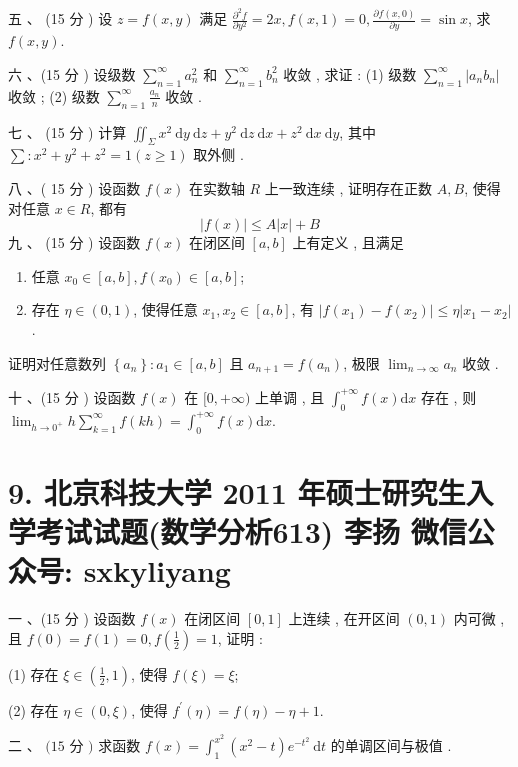 \documentclass[10pt]{article}
\begin{document}
{ 五 、 (15  分 )  设  $z=f(x, y)$  满足  $\frac{\partial^{2} f}{\partial y^{2}}=2 x, f(x, 1)=0, \frac{\partial f(x, 0)}{\partial y}=\sin x$,  求  $f(x, y)$.

 六 、(15  分 )  设级数  $\sum_{n=1}^{\infty} a_{n}^{2}$  和  $\sum_{n=1}^{\infty} b_{n}^{2}$  收敛 ,  求证 : (1)  级数  $\sum_{n=1}^{\infty}\left|a_{n} b_{n}\right|$  收敛 ; (2)  级数  $\sum_{n=1}^{\infty} \frac{a_{n}}{n}$  收敛 .

 七 、 (15  分 )  计算  $\iint_{\Sigma} x^{2} \mathrm{~d} y \mathrm{~d} z+y^{2} \mathrm{~d} z \mathrm{~d} x+z^{2} \mathrm{~d} x \mathrm{~d} y$,  其中  $\sum: x^{2}+y^{2}+z^{2}=1(z \geq 1)$  取外侧 .

 八 、( 15  分 )  设函数  $f(x)$  在实数轴  $R$  上一致连续 ,  证明存在正数  $A, B$,  使得对任意  $x \in R$,  都有 
$$
|f(x)| \leq A|x|+B
$$
 九 、 (15  分 )  设函数  $f(x)$  在闭区间  $[a, b]$  上有定义 ,  且满足 

\begin{enumerate}
  \item  任意  $x_{0} \in[a, b], f\left(x_{0}\right) \in[a, b]$;

  \item  存在  $\eta \in(0,1)$,  使得任意  $x_{1}, x_{2} \in[a, b]$,  有  $\left|f\left(x_{1}\right)-f\left(x_{2}\right)\right| \leq \eta\left|x_{1}-x_{2}\right|$.

\end{enumerate}
 证明对任意数列  $\left\{a_{n}\right\}: a_{1} \in[a, b]$  且  $a_{n+1}=f\left(a_{n}\right)$,  极限  $\lim _{n \rightarrow \infty} a_{n}$  收敛 .

 十 、(15  分 )  设函数  $f(x)$  在  $[0,+\infty)$  上单调 ,  且  $\int_{0}^{+\infty} f(x) \mathrm{d} x$  存在 ,  则  $\lim _{h \rightarrow 0^{+}} h \sum_{k=1}^{\infty} f(k h)=\int_{0}^{+\infty} f(x) \mathrm{d} x$.

\section{9. 北京科技大学 2011 年硕士研究生入学考试试题(数学分析613) 
 李扬 
 微信公众号: sxkyliyang}
 一 、(15  分 )  设函数  $f(x)$  在闭区间  $[0,1]$  上连续 ,  在开区间  $(0,1)$  内可微 ,  且  $f(0)=f(1)=0, f\left(\frac{1}{2}\right)=1$,  证明 :

(1)  存在  $\xi \in\left(\frac{1}{2}, 1\right)$,  使得  $f(\xi)=\xi$;

(2)  存在  $\eta \in(0, \xi)$,  使得  $f^{\prime}(\eta)=f(\eta)-\eta+1$.

 二 、 $(15$  分  $)$  求函数  $f(x)=\int_{1}^{x^{2}}\left(x^{2}-t\right) e^{-t^{2}} \mathrm{~d} t$  的单调区间与极值 .

}
\end{document}
